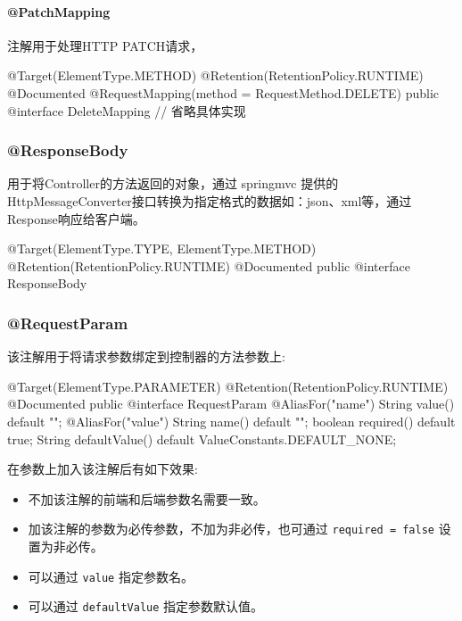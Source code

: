 \paragraph*{@PatchMapping}

注解用于处理HTTP PATCH请求，

\begin{Java}
@Target(ElementType.METHOD)
@Retention(RetentionPolicy.RUNTIME)
@Documented
@RequestMapping(method = RequestMethod.DELETE)
public @interface DeleteMapping {
    // 省略具体实现
}
\end{Java}

\subsubsection{@ResponseBody}

用于将Controller的方法返回的对象，通过 springmvc 提供的HttpMessageConverter接口转换为指定格式的数据如：json、xml等，通过Response响应给客户端。

\begin{Java}
@Target({ElementType.TYPE, ElementType.METHOD})
@Retention(RetentionPolicy.RUNTIME)
@Documented
public @interface ResponseBody { }    
\end{Java}

\subsubsection{@RequestParam}

该注解用于将请求参数绑定到控制器的方法参数上:

\begin{Java}
@Target(ElementType.PARAMETER)
@Retention(RetentionPolicy.RUNTIME)
@Documented
public @interface RequestParam {
    @AliasFor("name")
    String value() default "";
    @AliasFor("value")
    String name() default "";
    boolean required() default true;
    String defaultValue() default ValueConstants.DEFAULT_NONE;
}
\end{Java}

在参数上加入该注解后有如下效果:
\begin{itemize}
    \item 不加该注解的前端和后端参数名需要一致。
    \item 加该注解的参数为必传参数，不加为非必传，也可通过 \texttt{required = false} 设置为非必传。
    \item 可以通过 \texttt{value} 指定参数名。
    \item 可以通过 \texttt{defaultValue} 指定参数默认值。
\end{itemize}

